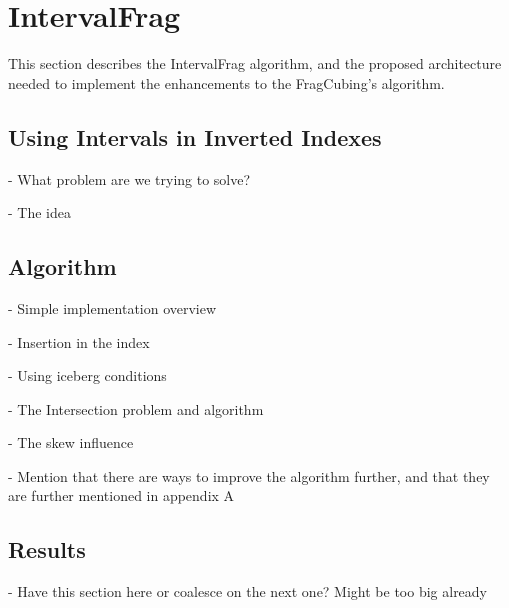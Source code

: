 
\chapter{IntervalFrag}\label{ch:interval}

This section describes the IntervalFrag algorithm, and the proposed architecture needed to implement the enhancements to the FragCubing's algorithm.

\section{Using Intervals in Inverted Indexes}\label{ch:interval:problem}

- What problem are we trying to solve?

- The idea

\section{Algorithm}\label{ch:interval:algo}

- Simple implementation overview

- Insertion in the index

- Using iceberg conditions

- The Intersection problem and algorithm

- The skew influence

- Mention that there are ways to improve the algorithm further, and that they are further mentioned in appendix A

\section{Results}\label{ch:interval:results}

- Have this section here or coalesce on the next one? Might be too big already

